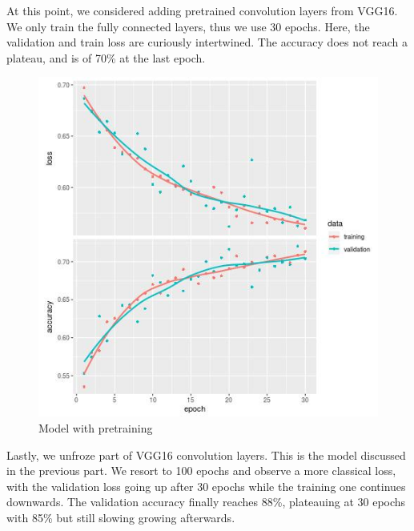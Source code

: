 \documentclass[]{book}
\begin{document}
\clearpage

At this point, we considered adding pretrained convolution layers from VGG16.
We only train the fully connected layers, thus we use 30 epochs.
Here, the validation and train loss are curiously intertwined.
The accuracy does not reach a plateau, and is of 70\% at the last epoch.

\begin{figure}
\centering
\includegraphics{history-CNN-augmented-pretrained.jpg}
\caption{Model with pretraining}
\end{figure}

\clearpage

Lastly, we unfroze part of VGG16 convolution layers.
This is the model discussed in the previous part.
We resort to 100 epochs and observe a more classical loss, with the validation loss going up after 30 epochs while the training one continues downwards.
The validation accuracy finally reaches 88\%, plateauing at 30 epochs with 85\% but still slowing growing afterwards.
\end{document}
